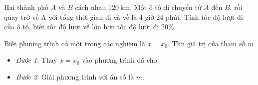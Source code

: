 \begin{vd} Hai thành phố $A$ và $B$ cách nhau $120 \mathrm{~km}$. Một ô tô di chuyển từ $A$ đến $B$, rồi quay trở về $\mathrm{A}$ với tổng thời gian đi và về là 4 giờ 24 phút. Tính tốc độ lượt đi của ô tô, biêt tốc độ lượt về lớn hơn tốc độ lượt đi $20 \%$.
\end{vd}
	\begin{dang}{\boldmath Biết phương trình có một trong các nghiệm là $x = x_0$. Tìm giá trị của tham số $m$}
	\begin{itemize}
		\item \textit{Bước 1}: Thay $x = x_0$ vào phương trình đã cho.
		\item \textit{Bước 2}: Giải phương trình với ẩn số là $m$.
	\end{itemize}
\end{dang}
